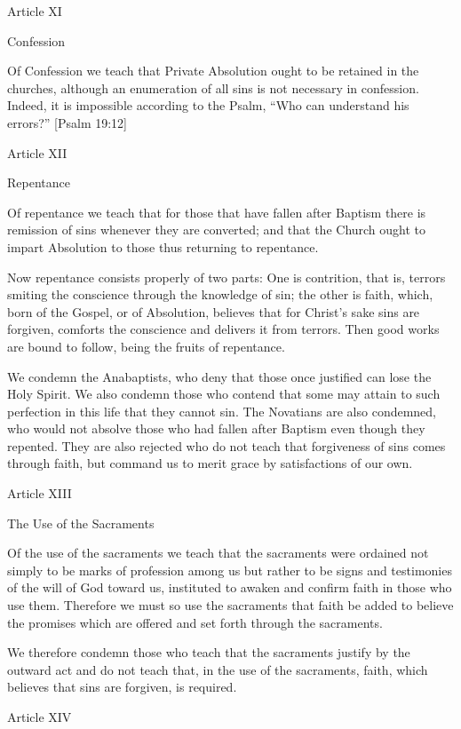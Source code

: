 Article XI

Confession

Of Confession we teach that Private Absolution ought to be retained in the churches, although an enumeration of all sins is not necessary in confession. Indeed, it is impossible according to the Psalm, “Who can understand his errors?” [Psalm 19:12]

 

Article XII

Repentance

Of repentance we teach that for those that have fallen after Baptism there is remission of sins whenever they are converted; and that the Church ought to impart Absolution to those thus returning to repentance.

Now repentance consists properly of two parts: One is contrition, that is, terrors smiting the conscience through the knowledge of sin; the other is faith, which, born of the Gospel, or of Absolution, believes that for Christ’s sake sins are forgiven, comforts the conscience and delivers it from terrors. Then good works are bound to follow, being the fruits of repentance.

We condemn the Anabaptists, who deny that those once justified can lose the Holy Spirit. We also condemn those who contend that some may attain to such perfection in this life that they cannot sin. The Novatians are also condemned, who would not absolve those who had fallen after Baptism even though they repented. They are also rejected who do not teach that forgiveness of sins comes through faith, but command us to merit grace by satisfactions of our own.

 

Article XIII

The Use of the Sacraments

Of the use of the sacraments we teach that the sacraments were ordained not simply to be marks of profession among us but rather to be signs and testimonies of the will of God toward us, instituted to awaken and confirm faith in those who use them. Therefore we must so use the sacraments that faith be added to believe the promises which are offered and set forth through the sacraments.

We therefore condemn those who teach that the sacraments justify by the outward act and do not teach that, in the use of the sacraments, faith, which believes that sins are forgiven, is required.

 

Article XIV

